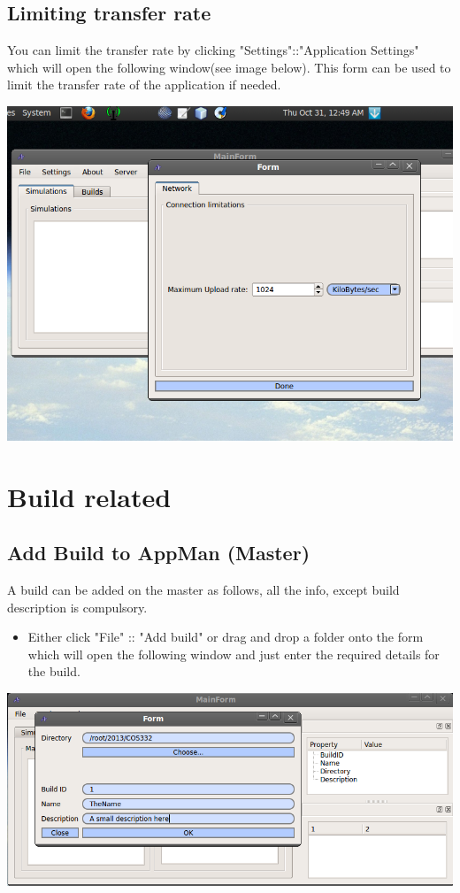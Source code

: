 \documentclass[a4paper,12pt,final]{article}
\begin{document}
\subsection{Limiting transfer rate}
You can limit the transfer rate by clicking "Settings"::"Application Settings" which will open the following window(see image below). This form can be used to limit the transfer rate of the application if needed.

\begin{center}
  	\includegraphics[scale=0.5]{uploadLimitation.png}
 \end{center}

\section{Build related}

\subsection{Add Build to AppMan (Master)}
A build can be added on the master as follows, all the info, except build description is compulsory.

\begin{itemize}
\item Either click "File" :: "Add build" or drag and drop a folder onto the form which will open the following window and just enter the required details for the build.
\end{itemize}
\begin{center}
  	\includegraphics[scale=0.4]{AddBuildLinux.png}
 \end{center}
\end{document}
